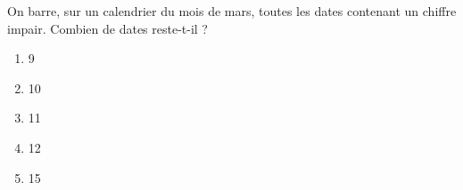 On barre, sur un calendrier du mois de mars, toutes les dates contenant un chiffre impair.
Combien de dates reste-t-il ?
\begin{multicols}{5}
  \begin{enumerate}[A/]
  \item 9
  \item 10
  \item 11
  \item 12
  \item 15
  \end{enumerate}
\end{multicols}